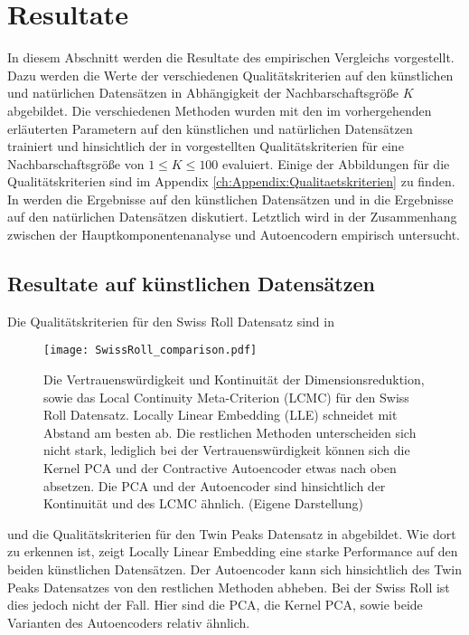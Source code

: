 \section{Resultate}
\label{ch:Vergleich:sec:Resultate}

In diesem Abschnitt werden die Resultate des empirischen Vergleichs vorgestellt. Dazu werden die
Werte der verschiedenen Qualitätskriterien auf den künstlichen und natürlichen Datensätzen in
Abhängigkeit der Nachbarschaftsgröße $K$ abgebildet. Die verschiedenen Methoden wurden mit den im
vorhergehenden  erläuterten Parametern auf
den künstlichen und natürlichen Datensätzen trainiert und hinsichtlich der in
 vorgestellten Qualitätskriterien für
eine Nachbarschaftsgröße von $1 \leq K \leq 100$ evaluiert. Einige der Abbildungen für die
Qualitätskriterien sind im Appendix \ref{ch:Appendix:Qualitaetskriterien} zu finden. In
 werden die Ergebnisse auf den künstlichen
Datensätzen und in  die Ergebnisse auf den
natürlichen Datensätzen diskutiert. Letztlich wird in 
der Zusammenhang zwischen der Hauptkomponentenanalyse und Autoencodern empirisch untersucht.

\subsection{Resultate auf künstlichen Datensätzen}
\label{ch:Vergleich:sec:Resultate:kuenstlich}

Die Qualitätskriterien für den Swiss Roll Datensatz sind in 
\begin{figure}[ht]
	\begin{center}
		\texttt{[image: SwissRoll\_comparison.pdf]}
	\end{center}
	\caption[Qualitätskriterien für die Swiss Roll]{Die Vertrauenswürdigkeit und Kontinuität der Dimensionsreduktion, sowie das Local Continuity Meta-Criterion (LCMC) für den Swiss Roll Datensatz. Locally Linear Embedding (LLE) schneidet mit Abstand am besten ab. Die restlichen Methoden unterscheiden sich nicht stark, lediglich bei der Vertrauenswürdigkeit können sich die Kernel PCA und der Contractive Autoencoder etwas nach oben absetzen. Die PCA und der Autoencoder sind hinsichtlich der Kontinuität und des LCMC ähnlich. (Eigene Darstellung)}
	\label{fig:SwissRollMetrics}
\end{figure}
und die Qualitätskriterien für den Twin Peaks Datensatz in  abgebildet. Wie dort zu erkennen ist, zeigt Locally Linear Embedding eine starke Performance auf den beiden künstlichen Datensätzen. Der Autoencoder kann sich hinsichtlich des Twin Peaks Datensatzes von den restlichen Methoden abheben. Bei der Swiss Roll ist dies jedoch nicht der Fall. Hier sind die PCA, die Kernel PCA, sowie beide Varianten des Autoencoders relativ ähnlich.


